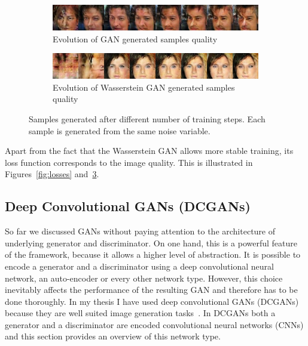 \begin{figure}[h]
  \begin{subfigure}[b]{\textwidth}
    \includegraphics[width=\textwidth]{figures/gan_progress}
    \caption{Evolution of GAN generated samples quality}
    \label{fig:gan_evolution}
  \end{subfigure}
  \begin{subfigure}[b]{\textwidth}
    \includegraphics[width=\textwidth]{figures/wgan_progress}
    \caption{Evolution of Wasserstein GAN generated samples quality}
    \label{fig:gan_evolution}
  \end{subfigure}
  \caption{Samples generated after different number of training steps. Each sample is generated from the same noise variable.}
  \label{fig:samples_evolution}
\end{figure}

Apart from the fact that the Wasserstein GAN allows more stable training, its loss function corresponds to the image quality. This is illustrated in Figures~\ref{fig:losses} and~\ref{fig:samples_evolution}.



\subsection{Deep Convolutional GANs (DCGANs)}
So far we discussed GANs without paying attention to the architecture of underlying generator and discriminator. On one hand, this is a powerful feature of the framework, because it allows a higher level of abstraction. It is possible to encode a generator and a discriminator using a deep convolutional neural network, an auto-encoder or every other network type. However, this choice inevitably affects the performance of the resulting GAN and therefore has to be done thoroughly. In my thesis I have used deep convolutional GANs (DCGANs) because they are well suited image generation tasks~\cite{dcgan}. In DCGANs both a generator and a discriminator are encoded convolutional neural networks (CNNs) and this section provides an overview of this network type. 

